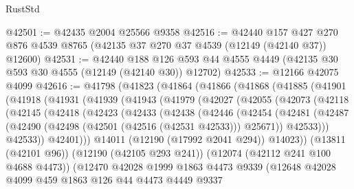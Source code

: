 \begin{lexlean}{RustStd}
\begin{coremodule}
@42501 := @42435 @2004 @25566 @9358
@42516 := @42440
    @157
    @427
    @270
    @876
    @4539
    @8765
    (@42135 @37 @270 @37 @4539 (@12149 (@42140 @37)) @12600)
@42531 := @42440
    @188
    @126
    @593
    @44
    @4555
    @4449
    (@42135 @30 @593 @30 @4555 (@12149 (@42140 @30)) @12702)
@42533 := @12166 @42075 @4099
@42616 := @41798
    (@41823
      (@41864
        (@41866
          (@41868
            (@41885
              (@41901
                (@41918
                  (@41931
                    (@41939
                      (@41943
                        (@41979
                          (@42027
                            (@42055
                              (@42073
                                (@42118
                                  (@42145
                                    (@42418
                                      (@42423
                                        (@42433
                                          (@42438
                                            (@42446
                                              (@42454
                                                (@42481
                                                  (@42487
                                                    (@42490
                                                      (@42498
                                                        (@42501 (@42516 (@42531 @42533)))
                                                        @25671))
                                                    @42533)))
                                              @42533))
                                          @42401)))
                                    @14011
                                    (@12190 (@17992 @2041 @294))
                                    @14023))
                                (@13811 (@42101 @96))
                                (@12190 (@42105 @293 @241))
                                (@12074 (@42112 @241 @100 @4688 @4473))
                                (@12470
                                  @42028
                                  @1999
                                  @1863
                                  @4473
                                  @9339
                                  (@12648
                                    @42028
                                    @4099
                                    @459
                                    @1863
                                    @126
                                    @44
                                    @4473
                                    @4449
                                    @9337

\end{coremodule}
\end{lexlean}
